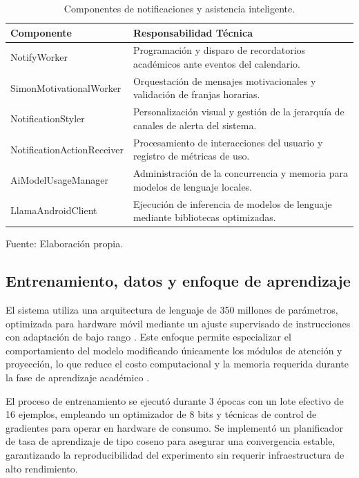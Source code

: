 \begin{table}[H]
\centering
\renewcommand{\arraystretch}{1.2}
\begin{tabularx}{\linewidth}{@{}>{\RaggedRight\arraybackslash}p{4cm}X@{}}
\toprule
Componente & Responsabilidad Técnica \\
\midrule
NotifyWorker & Programación y disparo de recordatorios académicos ante eventos del calendario. \\
SimonMotivationalWorker & Orquestación de mensajes motivacionales y validación de franjas horarias. \\
NotificationStyler & Personalización visual y gestión de la jerarquía de canales de alerta del sistema. \\
NotificationActionReceiver & Procesamiento de interacciones del usuario y registro de métricas de uso. \\
AiModelUsageManager & Administración de la concurrencia y memoria para modelos de lenguaje locales. \\
LlamaAndroidClient & Ejecución de inferencia de modelos de lenguaje mediante bibliotecas optimizadas. \\
\bottomrule
\end{tabularx}
\caption{Componentes de notificaciones y asistencia inteligente.}\label{tab:f7_notificaciones_ia}
Fuente: Elaboración propia.
\end{table}

\subsection{Entrenamiento, datos y enfoque de aprendizaje}
El sistema utiliza una arquitectura de lenguaje de 350 millones de parámetros, optimizada para hardware móvil mediante un ajuste supervisado de instrucciones con adaptación de bajo rango \cite{liquidai_lfm}. Este enfoque permite especializar el comportamiento del modelo modificando únicamente los módulos de atención y proyección, lo que reduce el costo computacional y la memoria requerida durante la fase de aprendizaje académico \cite{lora_paper, llm_finetuning}.

El proceso de entrenamiento se ejecutó durante 3 épocas con un lote efectivo de 16 ejemplos, empleando un optimizador de 8 bits y técnicas de control de gradientes para operar en hardware de consumo. Se implementó un planificador de tasa de aprendizaje de tipo coseno para asegurar una convergencia estable, garantizando la reproducibilidad del experimento sin requerir infraestructura de alto rendimiento.

